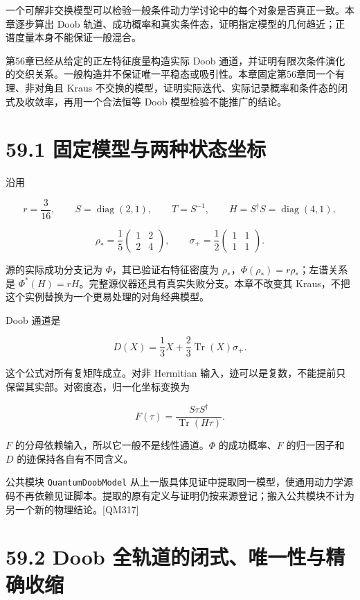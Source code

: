 \documentclass[
  11pt,
  oneside]{book}
\begin{document}
一个可解非交换模型可以检验一般条件动力学讨论中的每个对象是否真正一致。本章逐步算出
Doob
轨道、成功概率和真实条件态，证明指定模型的几何趋近；正谱度量本身不能保证一般混合。

第56章已经从给定的正左特征度量构造实际 Doob
通道，并证明有限次条件演化的交织关系。一般构造并不保证唯一平稳态或吸引性。本章固定第56章同一个有理、非对角且
Kraus
不交换的模型，证明实际迭代、实际记录概率和条件态的闭式及收敛率，再用一个合法恒等
Doob 模型检验不能推广的结论。

\section{59.1 固定模型与两种状态坐标}

沿用

\[
r=\frac3{16},\qquad S=\operatorname{diag}(2,1),\qquad T=S^{-1},\qquad
H=S^\dagger S=\operatorname{diag}(4,1),
\]

\[
\rho_* =\frac15\begin{pmatrix}1&2\\2&4\end{pmatrix},\qquad
\sigma_+=\frac12\begin{pmatrix}1&1\\1&1\end{pmatrix}.
\]

源的实际成功分支记为 \(\Phi\)，其已验证右特征密度为
\(\rho_*\)，\(\Phi(\rho_*)=r\rho_*\)；左谱关系是
\(\Phi^*(H)=rH\)。完整源仪器还具有真实失败分支。本章不改变其
Kraus，不把这个实例替换为一个更易处理的对角经典模型。

Doob 通道是

\[
D(X)=\frac13X+\frac23\operatorname{Tr}(X)\sigma_+.
\]

这个公式对所有复矩阵成立。对非 Hermitian
输入，迹可以是复数，不能提前只保留其实部。对密度态，归一化坐标变换为

\[
F(\tau)=\frac{S\tau S^\dagger}{\operatorname{Tr}(H\tau)}.
\]

\(F\) 的分母依赖输入，所以它一般不是线性通道。\(\Phi\) 的成功概率、\(F\)
的归一因子和 \(D\) 的迹保持各自有不同含义。

公共模块 \texttt{Quantum\allowbreak Doob\allowbreak Model}
从上一版具体见证中提取同一模型，使通用动力学源码不再依赖见证脚本。提取的原有定义与证明仍按来源登记；搬入公共模块不计为另一个新的物理结论。{[}QM317{]}

\section{59.2 Doob 全轨道的闭式、唯一性与精确收缩}
\end{document}

